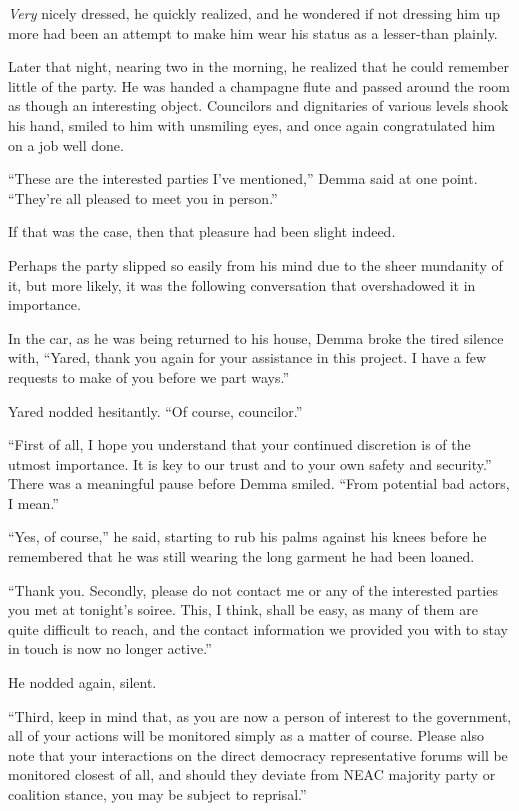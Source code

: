 \emph{Very} nicely dressed, he quickly realized, and he wondered if not dressing him up more had been an attempt to make him wear his status as a lesser-than plainly.

Later that night, nearing two in the morning, he realized that he could remember little of the party. He was handed a champagne flute and passed around the room as though an interesting object. Councilors and dignitaries of various levels shook his hand, smiled to him with unsmiling eyes, and once again congratulated him on a job well done.

``These are the interested parties I've mentioned,'' Demma said at one point. ``They're all pleased to meet you in person.''

If that was the case, then that pleasure had been slight indeed.

Perhaps the party slipped so easily from his mind due to the sheer mundanity of it, but more likely, it was the following conversation that overshadowed it in importance.

In the car, as he was being returned to his house, Demma broke the tired silence with, ``Yared, thank you again for your assistance in this project. I have a few requests to make of you before we part ways.''

Yared nodded hesitantly. ``Of course, councilor.''

``First of all, I hope you understand that your continued discretion is of the utmost importance. It is key to our trust and to your own safety and security.'' There was a meaningful pause before Demma smiled. ``From potential bad actors, I mean.''

``Yes, of course,'' he said, starting to rub his palms against his knees before he remembered that he was still wearing the long garment he had been loaned.

``Thank you. Secondly, please do not contact me or any of the interested parties you met at tonight's soiree. This, I think, shall be easy, as many of them are quite difficult to reach, and the contact information we provided you with to stay in touch is now no longer active.''

He nodded again, silent.

``Third, keep in mind that, as you are now a person of interest to the government, all of your actions will be monitored simply as a matter of course. Please also note that your interactions on the direct democracy representative forums will be monitored closest of all, and should they deviate from NEAC majority party or coalition stance, you may be subject to reprisal.''

